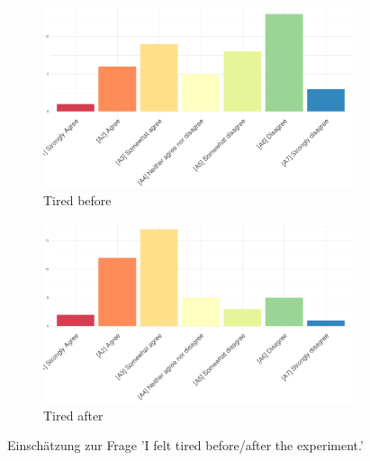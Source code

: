 
\begin{figure}[H]
	\centering
	\begin{subfigure}{0.48\textwidth}
		\includegraphics[width=\textwidth]{./_StudyResults/tiredBefore}
		\caption{Tired before}
		\label{fig:tiredBefore}
	\end{subfigure}%
	\hfill
	\begin{subfigure}{0.48\textwidth}
		\includegraphics[width=\textwidth]{./_StudyResults/tiredAfter}
		\caption{Tired after}
		\label{fig:tiredAfter}
	\end{subfigure}
	\caption{Einschätzung zur Frage 'I felt tired before/after the experiment.'} %
\end{figure}


